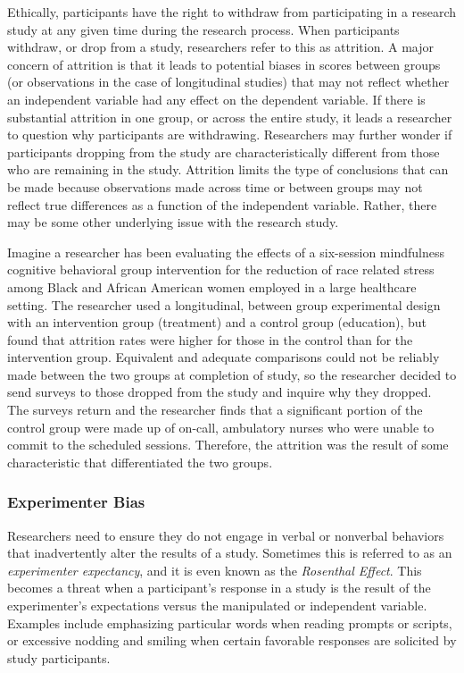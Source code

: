 \documentclass[
  11pt,
]{book}
\begin{document}
Ethically, participants have the right to withdraw from participating in a research study at any given time during the research process. When participants withdraw, or drop from a study, researchers refer to this as attrition. A major concern of attrition is that it leads to potential biases in scores between groups (or observations in the case of longitudinal studies) that may not reflect whether an independent variable had any effect on the dependent variable. If there is substantial attrition in one group, or across the entire study, it leads a researcher to question why participants are withdrawing. Researchers may further wonder if participants dropping from the study are characteristically different from those who are remaining in the study. Attrition limits the type of conclusions that can be made because observations made across time or between groups may not reflect true differences as a function of the independent variable. Rather, there may be some other underlying issue with the research study.

Imagine a researcher has been evaluating the effects of a six-session mindfulness cognitive behavioral group intervention for the reduction of race related stress among Black and African American women employed in a large healthcare setting. The researcher used a longitudinal, between group experimental design with an intervention group (treatment) and a control group (education), but found that attrition rates were higher for those in the control than for the intervention group. Equivalent and adequate comparisons could not be reliably made between the two groups at completion of study, so the researcher decided to send surveys to those dropped from the study and inquire why they dropped. The surveys return and the researcher finds that a significant portion of the control group were made up of on-call, ambulatory nurses who were unable to commit to the scheduled sessions. Therefore, the attrition was the result of some characteristic that differentiated the two groups.

\hypertarget{experimenter-bias}{%
\subsubsection{Experimenter Bias}\label{experimenter-bias}}

Researchers need to ensure they do not engage in verbal or nonverbal behaviors that inadvertently alter the results of a study. Sometimes this is referred to as an \emph{experimenter expectancy}, and it is even known as the \emph{Rosenthal Effect}. This becomes a threat when a participant's response in a study is the result of the experimenter's expectations versus the manipulated or independent variable. Examples include emphasizing particular words when reading prompts or scripts, or excessive nodding and smiling when certain favorable responses are solicited by study participants.
\end{document}
